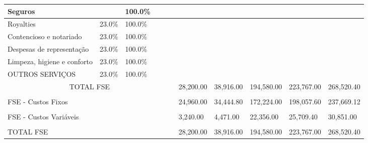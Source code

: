\documentclass[11pt]{article}
\begin{document}
\begin{adjustbox}{center}
\begin{tabular}{|l|l|l|l|l|l|l|l|l|l|l|}
			Seguros                                     &          & 100.0\% &        &              &      &           &           &            &            &            \\ \hline
			Royalties                                   & 23.0\%   & 100.0\% &        &              &      &           &           &            &            &            \\ \hline
			Contencioso e notariado                     & 23.0\%   & 100.0\% &        &              &      &           &           &            &            &            \\ \hline
			Despesas de representação                   & 23.0\%   & 100.0\% &        &              &      &           &           &            &            &            \\ \hline
			Limpeza, higiene e conforto                 & 23.0\%   & 100.0\% &        &              &      &           &           &            &            &            \\ \hline
			OUTROS SERVIÇOS                             & 23.0\%   & 100.0\% &        &              &      &           &           &            &            &            \\ \hline
			\multicolumn{6}{|c|}{TOTAL FSE}                                                                 & 28,200.00 & 38,916.00 & 194,580.00 & 223,767.00 & 268,520.40 \\ \hline
			&          &         &        &              &      &           &           &            &            &            \\ \hline
			\multicolumn{5}{|l|}{FSE - Custos Fixos}                                                 &      & 24,960.00 & 34,444.80 & 172,224.00 & 198,057.60 & 237,669.12 \\ \hline
			&          &         &        &              &      &           &           &            &            &            \\ \hline
			\multicolumn{5}{|l|}{FSE - Custos Variáveis}                                             &      & 3,240.00  & 4,471.00  & 22,356.00  & 25,709.40  & 30,851.00  \\ \hline
			&          &         &        &              &      &           &           &            &            &            \\ \hline
			\multicolumn{5}{|l|}{TOTAL FSE}                                                          &      & 28,200.00 & 38,916.00 & 194,580.00 & 223,767.00 & 268,520.40 \\ \hline

\end{tabular}
\end{adjustbox}
\end{document}
